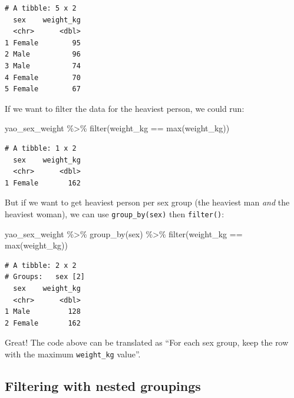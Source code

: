 \documentclass[
  letterpaper,
  DIV=11,
  numbers=noendperiod]{scrreprt}
\newenvironment{Shaded}{\begin{snugshade}}{\end{snugshade}}
\newcommand{\FunctionTok}[1]{\textcolor[rgb]{0.28,0.35,0.67}{#1}}
\newcommand{\NormalTok}[1]{\textcolor[rgb]{0.00,0.23,0.31}{#1}}
\newcommand{\SpecialCharTok}[1]{\textcolor[rgb]{0.37,0.37,0.37}{#1}}
\begin{document}
\begin{verbatim}
# A tibble: 5 x 2
  sex    weight_kg
  <chr>      <dbl>
1 Female        95
2 Male          96
3 Male          74
4 Female        70
5 Female        67
\end{verbatim}

If we want to filter the data for the heaviest person, we could run:

\begin{Shaded}
\begin{Highlighting}[]
\NormalTok{yao\_sex\_weight }\SpecialCharTok{\%\textgreater{}\%} 
  \FunctionTok{filter}\NormalTok{(weight\_kg }\SpecialCharTok{==} \FunctionTok{max}\NormalTok{(weight\_kg))}
\end{Highlighting}
\end{Shaded}

\begin{verbatim}
# A tibble: 1 x 2
  sex    weight_kg
  <chr>      <dbl>
1 Female       162
\end{verbatim}

But if we want to get heaviest person per sex group (the heaviest man
\emph{and} the heaviest woman), we can use \texttt{group\_by(sex)} then
\texttt{filter()}:

\begin{Shaded}
\begin{Highlighting}[]
\NormalTok{yao\_sex\_weight }\SpecialCharTok{\%\textgreater{}\%} 
  \FunctionTok{group\_by}\NormalTok{(sex) }\SpecialCharTok{\%\textgreater{}\%} 
  \FunctionTok{filter}\NormalTok{(weight\_kg }\SpecialCharTok{==} \FunctionTok{max}\NormalTok{(weight\_kg))}
\end{Highlighting}
\end{Shaded}

\begin{verbatim}
# A tibble: 2 x 2
# Groups:   sex [2]
  sex    weight_kg
  <chr>      <dbl>
1 Male         128
2 Female       162
\end{verbatim}

Great! The code above can be translated as ``For each sex group, keep
the row with the maximum \texttt{weight\_kg} value''.

\subsection*{Filtering with nested
groupings}\label{filtering-with-nested-groupings}
\end{document}
